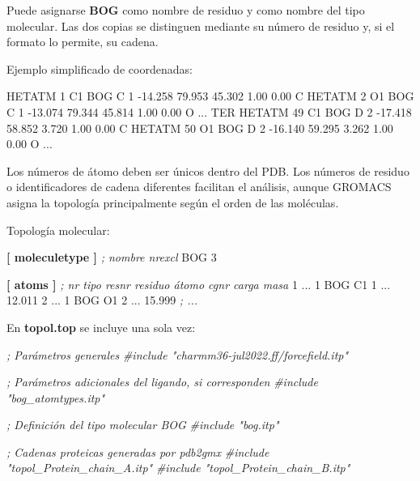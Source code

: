 \documentclass[
  spanish,
  11pt,
  a4paper]{article}
\newenvironment{Shaded}{\begin{snugshade}}{\end{snugshade}}
\newcommand{\CommentTok}[1]{\textcolor[rgb]{0.56,0.35,0.01}{\textit{#1}}}
\newcommand{\DataTypeTok}[1]{\textcolor[rgb]{0.13,0.29,0.53}{#1}}
\newcommand{\KeywordTok}[1]{\textcolor[rgb]{0.13,0.29,0.53}{\textbf{#1}}}
\newcommand{\NormalTok}[1]{#1}
\begin{document}
Puede asignarse \textbf{BOG} como nombre de residuo y como nombre del
tipo molecular. Las dos copias se distinguen mediante su número de
residuo y, si el formato lo permite, su cadena.

Ejemplo simplificado de coordenadas:

\begin{Shaded}
\begin{Highlighting}[]
\NormalTok{HETATM    1  C1  BOG C   1     {-}14.258  79.953  45.302  1.00  0.00           C}
\NormalTok{HETATM    2  O1  BOG C   1     {-}13.074  79.344  45.814  1.00  0.00           O}
\NormalTok{...}
\NormalTok{TER}
\NormalTok{HETATM   49  C1  BOG D   2     {-}17.418  58.852   3.720  1.00  0.00           C}
\NormalTok{HETATM   50  O1  BOG D   2     {-}16.140  59.295   3.262  1.00  0.00           O}
\NormalTok{...}
\end{Highlighting}
\end{Shaded}

Los números de átomo deben ser únicos dentro del PDB. Los números de
residuo o identificadores de cadena diferentes facilitan el análisis,
aunque GROMACS asigna la topología principalmente según el orden de las
moléculas.

Topología molecular:

\begin{Shaded}
\begin{Highlighting}[]
\KeywordTok{[ moleculetype ]}
\CommentTok{; nombre   nrexcl}
\DataTypeTok{BOG        3}

\KeywordTok{[ atoms ]}
\CommentTok{; nr  tipo  resnr  residuo  átomo  cgnr  carga  masa}
\DataTypeTok{1     ...   1      BOG      C1     1     ...    12.011}
\DataTypeTok{2     ...   1      BOG      O1     2     ...    15.999}
\CommentTok{; ...}
\end{Highlighting}
\end{Shaded}

En \textbf{topol.top} se incluye una sola vez:

\begin{Shaded}
\begin{Highlighting}[]
\CommentTok{; Parámetros generales}
\CommentTok{\#include "charmm36{-}jul2022.ff/forcefield.itp"}

\CommentTok{; Parámetros adicionales del ligando, si corresponden}
\CommentTok{\#include "bog\_atomtypes.itp"}

\CommentTok{; Definición del tipo molecular BOG}
\CommentTok{\#include "bog.itp"}

\CommentTok{; Cadenas proteicas generadas por pdb2gmx}
\CommentTok{\#include "topol\_Protein\_chain\_A.itp"}
\CommentTok{\#include "topol\_Protein\_chain\_B.itp"}
\end{Highlighting}
\end{Shaded}
\end{document}
